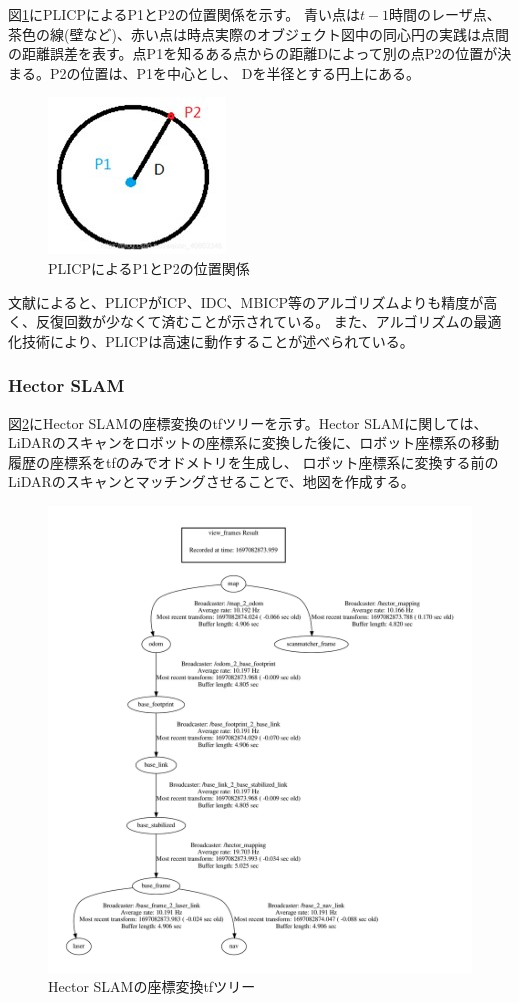図\ref{slam:plicp_p1p2}にPLICPによるP1とP2の位置関係を示す。
青い点は$t-1$時間のレーザ点、茶色の線(壁など)、赤い点は時点実際のオブジェクト図中の同心円の実践は点間の距離誤差を表す。点P1を知るある点からの距離Dによって別の点P2の位置が決まる。P2の位置は、P1を中心とし、
Dを半径とする円上にある。

\begin{figure}[h]
  \begin{center}
    \includegraphics[width=.3\linewidth]{img/slam_27.jpg}
    \caption{PLICPによるP1とP2の位置関係\cite{slam:china}}
    \label{slam:plicp_p1p2}
  \end{center}
\end{figure}

文献\cite{slam:china}によると、PLICPがICP、IDC、MBICP等のアルゴリズムよりも精度が高く、反復回数が少なくて済むことが示されている。
また、アルゴリズムの最適化技術により、PLICPは高速に動作することが述べられている。

\subsubsection{Hector SLAM}
図\ref{slam:tf3}にHector SLAMの座標変換のtfツリーを示す。Hector SLAMに関しては、LiDARのスキャンをロボットの座標系に変換した後に、ロボット座標系の移動履歴の座標系をtfのみでオドメトリを生成し、
ロボット座標系に変換する前のLiDARのスキャンとマッチングさせることで、地図を作成する。

\begin{figure}[h]
  \begin{center}
  \includegraphics[width=.8\linewidth]{img/slam_28.pdf}
  \caption{Hector SLAMの座標変換tfツリー}
  \label{slam:tf3}
  \end{center}
\end{figure}


